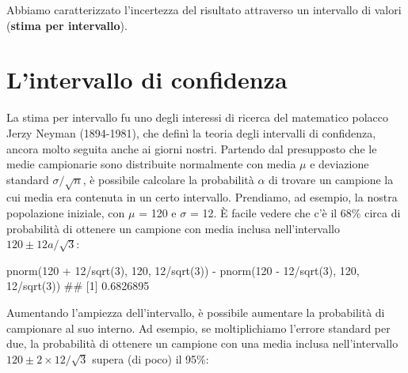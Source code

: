 \documentclass[a4paper,12pt,oneside]{book}
\newenvironment{Shaded}{\begin{snugshade}}{\end{snugshade}}
\newcommand{\DecValTok}[1]{#1}
\newcommand{\SpecialCharTok}[1]{#1}
\newcommand{\DocumentationTok}[1]{#1}
\newcommand{\FunctionTok}[1]{#1}
\newcommand{\NormalTok}[1]{#1}
\begin{document}
Abbiamo caratterizzato l'incertezza del risultato attraverso un intervallo di valori (\textbf{stima per intervallo}).

\hypertarget{lintervallo-di-confidenza}{%
\section{L'intervallo di confidenza}\label{lintervallo-di-confidenza}}

La stima per intervallo fu uno degli interessi di ricerca del matematico polacco Jerzy Neyman (1894-1981), che definì la teoria degli intervalli di confidenza, ancora molto seguita anche ai giorni nostri. Partendo dal presupposto che le medie campionarie sono distribuite normalmente con media \(\mu\) e deviazione standard \(\sigma/\sqrt{n}\), è possibile calcolare la probabilità \(\alpha\) di trovare un campione la cui media era contenuta in un certo intervallo. Prendiamo, ad esempio, la nostra popolazione iniziale, con \(\mu\) = 120 e \(\sigma\) = 12. È facile vedere che c'è il 68\% circa di probabilità di ottenere un campione con media inclusa nell'intervallo \(120 \pm 12a/\sqrt{3}\):

\begin{Shaded}
\begin{Highlighting}[]
\FunctionTok{pnorm}\NormalTok{(}\DecValTok{120} \SpecialCharTok{+} \DecValTok{12}\SpecialCharTok{/}\FunctionTok{sqrt}\NormalTok{(}\DecValTok{3}\NormalTok{), }\DecValTok{120}\NormalTok{, }\DecValTok{12}\SpecialCharTok{/}\FunctionTok{sqrt}\NormalTok{(}\DecValTok{3}\NormalTok{)) }\SpecialCharTok{{-}} 
  \FunctionTok{pnorm}\NormalTok{(}\DecValTok{120} \SpecialCharTok{{-}} \DecValTok{12}\SpecialCharTok{/}\FunctionTok{sqrt}\NormalTok{(}\DecValTok{3}\NormalTok{), }\DecValTok{120}\NormalTok{, }\DecValTok{12}\SpecialCharTok{/}\FunctionTok{sqrt}\NormalTok{(}\DecValTok{3}\NormalTok{))}
\DocumentationTok{\#\# [1] 0.6826895}
\end{Highlighting}
\end{Shaded}

Aumentando l'ampiezza dell'intervallo, è possibile aumentare la probabilità di campionare al suo interno. Ad esempio, se moltiplichiamo l'errore standard per due, la probabilità di ottenere un campione con una media inclusa nell'intervallo \(120 \pm 2 \times 12/\sqrt{3}\) supera (di poco) il 95\%:
\end{document}
